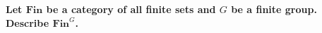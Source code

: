 \documentclass{article}
\begin{document}
\textbf{Let $\mathbf{Fin}$ be a category of all finite sets and $G$ be a finite group. Describe $\mathbf{Fin}^G$.}

\section{}

\section{}

\section{}

\section{}

\section{}

\section{}

\section{}

\section{}

\section{}

\section{}
\end{document}
